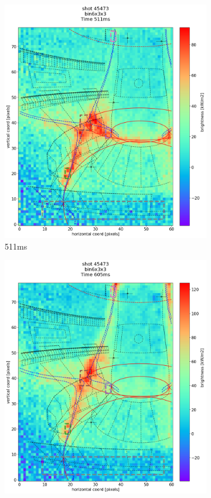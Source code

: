 \begin{figure}
\begin{subfigure}{0.355\linewidth}
         \includegraphics[trim={50 0 25 80},clip,width=\textwidth]{Chapters/chapter2/figs/IRVB-MASTU_shot-45473_export_35.png}
         \caption{511ms}
         \label{fig:45473_export_2}
     \end{subfigure}
     \begin{subfigure}{0.355\linewidth}
         \centering
         \includegraphics[trim={50 25 25 80},clip,width=\textwidth]{Chapters/chapter2/figs/IRVB-MASTU_shot-45473_export_36.png}

\end{subfigure}
\end{figure}
